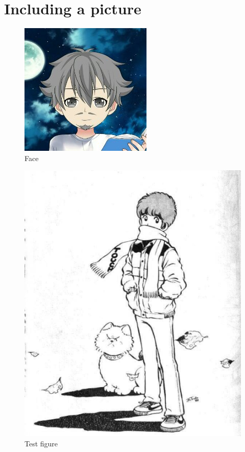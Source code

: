 \documentclass[a4paper]{article}
\begin{document}
\section{Including a picture}

\blindtext

\begin{figure}
\centering
\caption{Face}
\includegraphics{face}
\end{figure}

\begin{figure}
\centering

\includegraphics[scale=0.5]{kas}
\caption{Test figure}

\end{figure}

\blindtext
\end{document}

